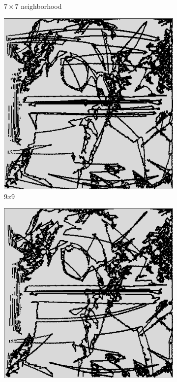 \begin{figure}[t]
\begin{subfigure}[t]{.15\textwidth}
        \caption{$7\times7$ neighborhood}
        \label{subfig:7x7}
    \end{subfigure}
    \begin{subfigure}[t]{.15\textwidth}
        \includegraphics[width=\textwidth]{Images/segmented_v4_9x9_neighborhood.png}
        \caption{$9x9$}
        \label{subfig:9x9}
    \end{subfigure}
    \begin{subfigure}[t]{.15\textwidth}
        \includegraphics[width=\textwidth]{Images/segmented_v5_11x11_neighborhood.png}

\end{subfigure}
\end{figure}

